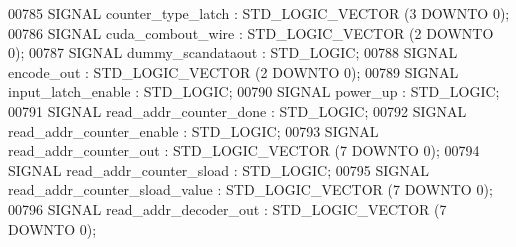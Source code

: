 \begin{DoxyCode}
{00785      \textcolor{keywordflow}{SIGNAL}  \textcolor{vhdlchar}{counter_type_latch} \textcolor{vhdlchar}{:}   \textcolor{comment}{STD\_LOGIC\_VECTOR} \textcolor{vhdlchar}{(}\textcolor{vhdllogic}{}\textcolor{vhdllogic}{3} \textcolor{keywordflow}{DOWNTO} \textcolor{vhdllogic}{}\textcolor{vhdllogic}{0}\textcolor{vhdlchar}{)};
00786      \textcolor{keywordflow}{SIGNAL}  \textcolor{vhdlchar}{cuda_combout_wire} \textcolor{vhdlchar}{:}    \textcolor{comment}{STD\_LOGIC\_VECTOR} \textcolor{vhdlchar}{(}\textcolor{vhdllogic}{}\textcolor{vhdllogic}{2} \textcolor{keywordflow}{DOWNTO} \textcolor{vhdllogic}{}\textcolor{vhdllogic}{0}\textcolor{vhdlchar}{)};
00787      \textcolor{keywordflow}{SIGNAL}  \textcolor{vhdlchar}{dummy_scandataout} \textcolor{vhdlchar}{:}    \textcolor{comment}{STD\_LOGIC};
00788      \textcolor{keywordflow}{SIGNAL}  \textcolor{vhdlchar}{encode_out} \textcolor{vhdlchar}{:}   \textcolor{comment}{STD\_LOGIC\_VECTOR} \textcolor{vhdlchar}{(}\textcolor{vhdllogic}{}\textcolor{vhdllogic}{2} \textcolor{keywordflow}{DOWNTO} \textcolor{vhdllogic}{}\textcolor{vhdllogic}{0}\textcolor{vhdlchar}{)};
00789      \textcolor{keywordflow}{SIGNAL}  \textcolor{vhdlchar}{input_latch_enable} \textcolor{vhdlchar}{:}   \textcolor{comment}{STD\_LOGIC};
00790      \textcolor{keywordflow}{SIGNAL}  \textcolor{vhdlchar}{power_up} \textcolor{vhdlchar}{:} \textcolor{comment}{STD\_LOGIC};
00791      \textcolor{keywordflow}{SIGNAL}  \textcolor{vhdlchar}{read_addr_counter_done} \textcolor{vhdlchar}{:}   \textcolor{comment}{STD\_LOGIC};
00792      \textcolor{keywordflow}{SIGNAL}  \textcolor{vhdlchar}{read_addr_counter_enable} \textcolor{vhdlchar}{:} \textcolor{comment}{STD\_LOGIC};
00793      \textcolor{keywordflow}{SIGNAL}  \textcolor{vhdlchar}{read_addr_counter_out} \textcolor{vhdlchar}{:}    \textcolor{comment}{STD\_LOGIC\_VECTOR} \textcolor{vhdlchar}{(}\textcolor{vhdllogic}{}\textcolor{vhdllogic}{7} \textcolor{keywordflow}{DOWNTO} \textcolor{vhdllogic}{}\textcolor{vhdllogic}{0}\textcolor{vhdlchar}{)};
00794      \textcolor{keywordflow}{SIGNAL}  \textcolor{vhdlchar}{read_addr_counter_sload} \textcolor{vhdlchar}{:}  \textcolor{comment}{STD\_LOGIC};
00795      \textcolor{keywordflow}{SIGNAL}  \textcolor{vhdlchar}{read_addr_counter_sload_value} \textcolor{vhdlchar}{:}    \textcolor{comment}{STD\_LOGIC\_VECTOR} \textcolor{vhdlchar}{(}\textcolor{vhdllogic}{}\textcolor{vhdllogic}{7} \textcolor{keywordflow}{DOWNTO} \textcolor{vhdllogic}{}\textcolor{vhdllogic}{0}\textcolor{vhdlchar}{)};
00796      \textcolor{keywordflow}{SIGNAL}  \textcolor{vhdlchar}{read_addr_decoder_out} \textcolor{vhdlchar}{:}    \textcolor{comment}{STD\_LOGIC\_VECTOR} \textcolor{vhdlchar}{(}\textcolor{vhdllogic}{}\textcolor{vhdllogic}{7} \textcolor{keywordflow}{DOWNTO} \textcolor{vhdllogic}{}\textcolor{vhdllogic}{0}\textcolor{vhdlchar}{)};
}
\end{DoxyCode}
